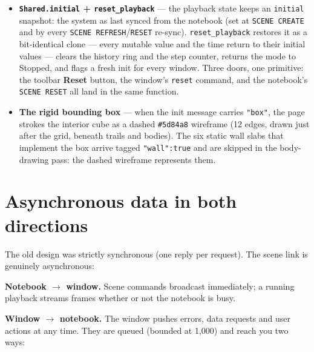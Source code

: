 \documentclass[11pt]{article}
\newcommand{\kw}[1]{\texttt{\uppercase{#1}}}
\newcommand{\code}[1]{\texttt{#1}}
\begin{document}
\begin{itemize}
      \code{P}/\code{L} lines showing the three components plus the
      \code{|.|} magnitude (5 digits). Entity labels, drawn in the
      body pass, prefer the init entity's \code{"name"} (the user's
      \kw{new} \code{...} \kw{as} registration) and fall back to
      \code{objN}.
\item \textbf{\code{Shared.initial} + \code{reset\_playback}} --- the
      playback state keeps an \code{initial} snapshot: the system as
      last synced from the notebook (set at \kw{scene create} and by
      every \kw{scene refresh}/\kw{reset} re-sync).
      \code{reset\_playback} restores it as a bit-identical clone ---
      every mutable value and the time return to their initial
      values --- clears the history ring and the step counter,
      returns the mode to Stopped, and flags a fresh init for every
      window. Three doors, one primitive: the toolbar \textbf{Reset}
      button, the window's \code{reset} command, and the notebook's
      \kw{scene reset} all land in the same function.
\item \textbf{The rigid bounding box} --- when the init message
      carries \code{"box"}, the page strokes the interior cube as a
      dashed \code{\#5d84a8} wireframe (12 edges, drawn just after
      the grid, beneath trails and bodies). The six static wall slabs
      that implement the box arrive tagged \code{"wall":true} and are
      skipped in the body-drawing pass: the dashed wireframe
      represents them.
\end{itemize}

\section{Asynchronous data in both directions}\label{sec:async}

The old design was strictly synchronous (one reply per request). The
scene link is genuinely asynchronous:

\textbf{Notebook $\to$ window.} Scene commands broadcast immediately;
a running playback streams frames whether or not the notebook is busy.

\textbf{Window $\to$ notebook.} The window pushes errors, data
requests and user actions at any time. They are queued (bounded at
1{,}000) and reach you two ways:
\end{document}
